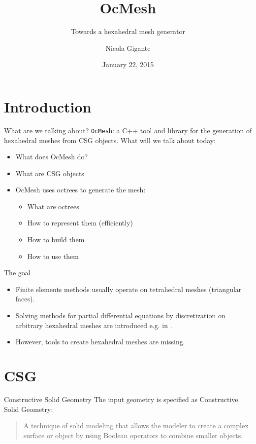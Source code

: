 \documentclass[utf8x]{beamer}
\title{OcMesh}
\subtitle{Towards a hexahedral mesh generator}
\author{Nicola Gigante}
\date{January 22, 2015}
\begin{document}
\begin{frame}
\maketitle
\end{frame}

\section{Introduction}
\begin{frame}[fragile]{What are we talking about?}
\verb|OcMesh|: a C++ tool and library for the generation of hexahedral meshes
from CSG objects.
\vfill
What will we talk about today:
\begin{itemize}
\item What does OcMesh do?
\item What are CSG objects
\item OcMesh uses octrees to generate the mesh:
      \begin{itemize}
      \item What are octrees
      \item How to represent them (efficiently)
      \item How to build them
      \item How to use them
      \end{itemize}
\end{itemize}
\end{frame}

\begin{frame}{The goal}
\begin{itemize}
\item Finite elements methods usually operate on tetrahedral meshes 
      (triangular faces).
\item Solving methods for partial differential equations by discretization on 
      arbitrary hexahedral meshes are introduced e.g. in \cite{Specogna2010}.
\item However, tools to create hexahedral meshes are missing.
\end{itemize}
\end{frame}

\section{CSG}
\begin{frame}{Constructive Solid Geometry}
The input geometry is specified as Constructive Solid Geometry:
\begin{quote}
A technique of solid modeling that allows the modeler to create a complex 
surface or object by using Boolean operators to combine smaller objects.
\end{quote}
\end{frame}
\end{document}

